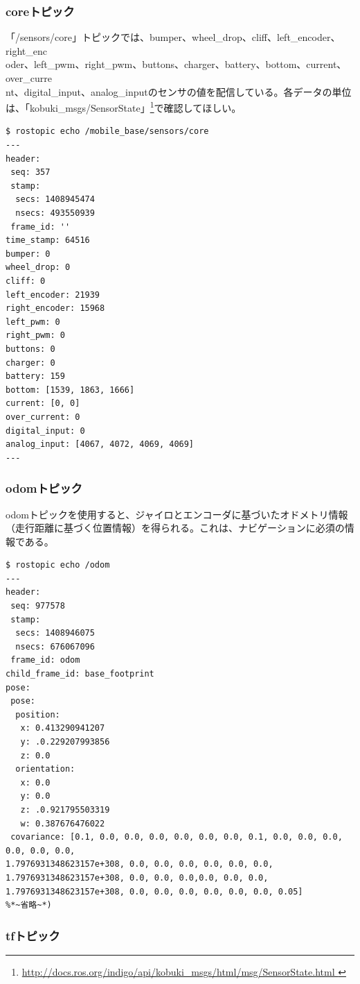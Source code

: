 \begin{itemize}
\subsubsection{coreトピック}

「/sensors/core」トピックでは、bumper、wheel\_drop、cliff、left\_encoder、right\_enc\\oder、left\_pwm、right\_pwm、buttons、charger、battery、bottom、current、over\_curre\\nt、digital\_input、analog\_inputのセンサの値を配信している。各データの単位は、「kobuki\_msgs/SensorState」\footnote{\url{http://docs.ros.org/indigo/api/kobuki\_msgs/html/msg/SensorState.html
}}で確認してほしい。

\begin{lstlisting}[language=ROS]
$ rostopic echo /mobile_base/sensors/core
---
header:
 seq: 357
 stamp:
  secs: 1408945474
  nsecs: 493550939
 frame_id: ''
time_stamp: 64516
bumper: 0
wheel_drop: 0
cliff: 0
left_encoder: 21939
right_encoder: 15968
left_pwm: 0
right_pwm: 0
buttons: 0
charger: 0
battery: 159
bottom: [1539, 1863, 1666]
current: [0, 0]
over_current: 0
digital_input: 0
analog_input: [4067, 4072, 4069, 4069]
---
\end{lstlisting}

\subsubsection{odomトピック}

odomトピックを使用すると、ジャイロとエンコーダに基づいたオドメトリ情報（走行距離に基づく位置情報）を得られる。これは、ナビゲーションに必須の情報である。

\begin{lstlisting}[language=ROS]
$ rostopic echo /odom
---
header:
 seq: 977578
 stamp:
  secs: 1408946075
  nsecs: 676067096
 frame_id: odom
child_frame_id: base_footprint
pose:
 pose:
  position:
   x: 0.413290941207
   y: .0.229207993856
   z: 0.0
  orientation:
   x: 0.0
   y: 0.0
   z: .0.921795503319
   w: 0.387676476022
 covariance: [0.1, 0.0, 0.0, 0.0, 0.0, 0.0, 0.0, 0.1, 0.0, 0.0, 0.0, 0.0, 0.0, 0.0,
1.7976931348623157e+308, 0.0, 0.0, 0.0, 0.0, 0.0, 0.0, 1.7976931348623157e+308, 0.0, 0.0, 0.0,0.0, 0.0, 0.0, 1.7976931348623157e+308, 0.0, 0.0, 0.0, 0.0, 0.0, 0.0, 0.05]
%*~省略~*)
\end{lstlisting}

\subsubsection{tfトピック}


\end{itemize}
